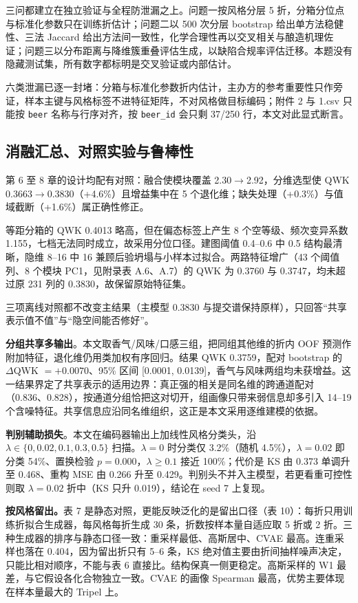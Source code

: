 \documentclass[zihao=-4,a4paper,UTF8,fontset=none]{ctexart}
\begin{document}
三问都建立在独立验证与全程防泄漏之上。问题一按风格分层 5 折，分箱分位点与标准化参数只在训练折估计；问题二以 500 次分层 bootstrap 给出单方法稳健性、三法 Jaccard 给出方法间一致性，化学合理性再以交叉相关与酿造机理佐证；问题三以分布距离与降维簇重叠评估生成，以缺陷合规率评估迁移。本题没有隐藏测试集，所有数字都标明是交叉验证或内部估计。

六类泄漏已逐一封堵：分箱与标准化参数折内估计，主办方的参考重要性只作旁证，样本主键与风格标签不进特征矩阵，不对风格做目标编码；附件 2 与 1.csv 只能按 \texttt{beer} 名称与行序对齐，按 \texttt{beer\_id} 会只剩 37/250 行，本文对此显式断言。

\subsection{消融汇总、对照实验与鲁棒性}

第 6 至 8 章的设计均配有对照：融合使模块覆盖 2.30$\to$2.92，分维选型使 QWK 0.3663$\to$0.3830（+4.6\%）且增益集中在 5 个退化维；缺失处理（+0.3\%）与值域截断（+1.6\%）属正确性修正。

等距分箱的 QWK 0.4013 略高，但在偏态标签上产生 8 个空等级、频次变异系数 1.155，七档无法同时成立，故采用分位口径。建图阈值 0.4--0.6 中 0.5 结构最清晰，隐维 8--16 中 16 兼顾后验坍塌与小样本过拟合。两路特征增广（43 个阈值列、8 个模块 PC1，见附录表 A.6、A.7）的 QWK 为 0.3760 与 0.3747，均未超过原 231 列的 0.3830，故保留原始特征集。

三项离线对照都不改变主结果（主模型 0.3830 与提交谱保持原样），只回答“共享表示值不值”与“隐空间能否修好”。

\textbf{分组共享多输出}。本文取香气/风味/口感三组，把同组其他维的折内 OOF 预测作附加特征，退化维仍用类加权有序回归。结果 QWK 0.3759，配对 bootstrap 的 $\Delta$QWK $=+0.0070$、95\% 区间 [0.0001, 0.0139]，香气与风味两组均未获增益。这一结果界定了共享表示的适用边界：真正强的相关是同名维的跨通道配对（0.836、0.828），按通道分组恰把这对切开，组画像只带来弱信息却多引入 14--19 个含噪特征。共享信息应沿同名维组织，这正是本文采用逐维建模的依据。

\textbf{判别辅助损失}。本文在编码器输出上加线性风格分类头，沿 $\lambda\in\{0,0.02,0.1,0.3,0.5\}$ 扫描。$\lambda=0$ 时分类仅 3.2\%（随机 4.5\%），$\lambda=0.02$ 即分类 54\%、置换检验 $p=0.000$，$\lambda\ge0.1$ 接近 100\%；代价是 KS 由 0.373 单调升至 0.468、重构 MSE 由 0.266 升至 0.429。判别头不并入主模型，若更看重可控性则取 $\lambda=0.02$ 折中（KS 只升 0.019），结论在 seed 7 上复现。

\textbf{按风格留出。}表 7 是静态对照，更能反映泛化的是留出口径（表 10）：每折只用训练折拟合生成器，每风格每折生成 30 条，折数按样本量自适应取 5 折或 2 折。三种生成器的排序与静态口径一致：重采样最低、高斯居中、CVAE 最高。连重采样也落在 0.404，因为留出折只有 5--6 条，KS 绝对值主要由折间抽样噪声决定，只能比相对顺序，不能与表 6 直接比。结构保真一侧更稳定。高斯采样的 W1 最差，与它假设各化合物独立一致。CVAE 的画像 Spearman 最高，优势主要体现在样本量最大的 Tripel 上。
\end{document}
